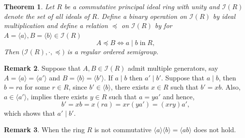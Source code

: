 \documentclass[12pt,a4paper]{amsart}
\theoremstyle{plain}
\newtheorem{theorem}{Theorem}[section]
\theoremstyle{definition}
\newtheorem{remark}[theorem]{Remark}
\begin{document}
\begin{theorem}
	Let $R$ be a commutative principal ideal ring with unity and $\mathcal{I}(R)$ denote the set of all ideals of $R$. 
	Define a binary operation on $\mathcal{I}(R)$ by ideal multiplication and define a relation $\preccurlyeq$ on $\mathcal{I}(R)$ by for  $A  = \langle a \rangle, B = \langle b \rangle \in \mathcal{I}(R)$
	\[
	A \preccurlyeq B \iff a \mid b \; \text{in}\; R,
	\]
	Then $\big(\mathcal{I}(R), \cdot, \preccurlyeq\big)$ is a regular ordered semigroup.
\end{theorem}
\begin{remark}
	Suppose that $A, B \in \mathcal{I}(R)$ admit multiple generators, say 
	$A = \langle a \rangle = \langle a' \rangle$ and 
	$B = \langle b \rangle = \langle b' \rangle$. 
	If $a \mid b$ then $a' \mid b'$.  Suppose that $a \mid b$, then $b = ra$ for some $r \in R$, since $b' \in \langle b \rangle$, there exists $x \in R$ such that $b' = xb$. 
	Also, $a \in \langle a' \rangle$, implies there exists $y \in R$ such that $a = ya'$ and hence,
	\[
	b' = xb = x(ra) = xr(ya') = (xry)a',
	\]
	which shows that $a' \mid b'$.
\end{remark}
\begin{remark} When the ring $R$ is not commutative 
$\langle a\rangle \langle b\rangle = \langle ab\rangle$
does not  hold. 
\end{remark}
\end{document}
